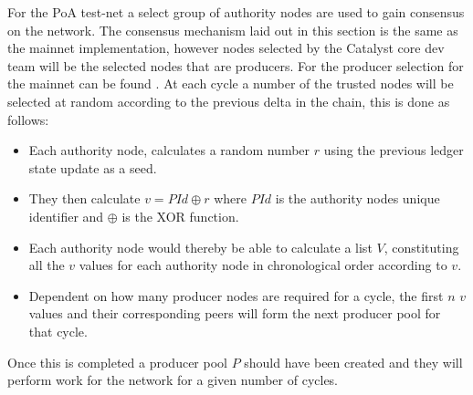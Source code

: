 For the PoA test-net a select group of authority nodes are used to gain consensus on the network. The consensus mechanism laid out in this section is the same as the mainnet implementation, however nodes selected by the Catalyst core dev team will be the selected nodes that are producers. For the producer selection for the mainnet can be found \cite{CatRand}. At each cycle a number of the trusted nodes will be selected at random according to the previous delta in the chain, this is done as follows: 

\begin{itemize}
\item Each authority node, calculates a random number $r$ using the previous ledger state update as a seed. 
\item They then calculate $v = PId \oplus r$ where $PId$ is the authority nodes unique identifier and $\oplus$ is the XOR function. 
\item Each authority node would thereby be able to calculate a list $V$, constituting all the $v$ values for each authority node in chronological order according to $v$. 
\item Dependent on how many producer nodes are required for a cycle, the first $n$ $v$ values and their corresponding peers will form the next producer pool for that cycle. 
\end{itemize} 

Once this is completed a producer pool $P$ should have been created and they will perform work for the network for a given number of cycles. 


